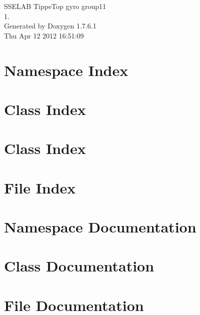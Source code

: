 \documentclass[a4paper]{book}
\begin{document}
\begin{titlepage}
\vspace*{7cm}
\begin{center}
{\Large \-S\-S\-E\-L\-A\-B \-Tippe\-Top gyro group11 \\[1ex]\large 1. }\\
\vspace*{1cm}
{\large \-Generated by Doxygen 1.7.6.1}\\
\vspace*{0.5cm}
{\small Thu Apr 12 2012 16:51:09}\\
\end{center}
\end{titlepage}
\clearemptydoublepage
{}
\tableofcontents
\clearemptydoublepage
{}
\chapter{\-Namespace \-Index}

\chapter{\-Class \-Index}

\chapter{\-Class \-Index}

\chapter{\-File \-Index}

\chapter{\-Namespace \-Documentation}


\chapter{\-Class \-Documentation}







\chapter{\-File \-Documentation}











\printindex
\end{document}

